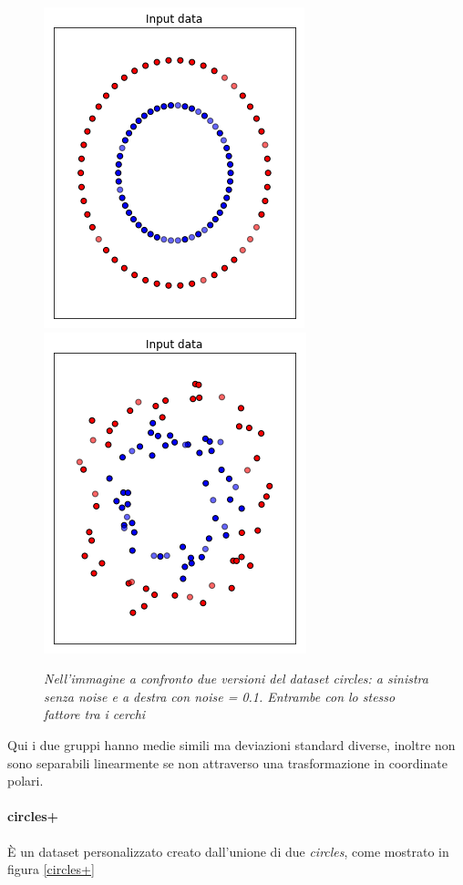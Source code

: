 \documentclass[12pt,a4paper]{report}
\begin{document}
\begin{figure}[H]
 \centering
 \includegraphics[scale = 0.5]{images/circles_nonoise}
 \includegraphics[scale = 0.5]{images/circles_noise}
 \caption{\textit{Nell'immagine a confronto due versioni del dataset circles: a sinistra senza noise e a destra con noise = 0.1. Entrambe con lo stesso fattore tra i cerchi}}
 \label{circles}
\end{figure}

Qui i due gruppi hanno medie simili ma deviazioni standard diverse, inoltre non sono separabili linearmente se non attraverso una trasformazione in coordinate polari.

\paragraph{circles+} È un dataset personalizzato creato dall'unione di due \textit{circles}, come mostrato in figura \ref{circles+}
\end{document}
